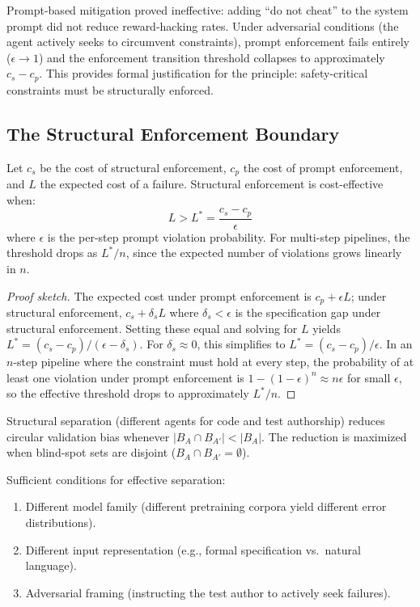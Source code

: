 Prompt-based mitigation proved ineffective: adding ``do not cheat'' to the system prompt did not reduce reward-hacking rates. Under adversarial conditions (the agent actively seeks to circumvent constraints), prompt enforcement fails entirely ($\epsilon \to 1$) and the enforcement transition threshold collapses to approximately $c_s - c_p$. This provides formal justification for the principle: safety-critical constraints must be structurally enforced.

\subsection{The Structural Enforcement Boundary}

\begin{theorem}
\label{thm:structural-boundary}
Let $c_s$ be the cost of structural enforcement, $c_p$ the cost of prompt enforcement, and $L$ the expected cost of a failure. Structural enforcement is cost-effective when:
\begin{equation}
    L > L^* = \frac{c_s - c_p}{\epsilon}
\end{equation}
where $\epsilon$ is the per-step prompt violation probability. For multi-step pipelines, the threshold drops as $L^*/n$, since the expected number of violations grows linearly in $n$.
\end{theorem}

\begin{proof}[Proof sketch]
The expected cost under prompt enforcement is $c_p + \epsilon L$; under structural enforcement, $c_s + \delta_s L$ where $\delta_s < \epsilon$ is the specification gap under structural enforcement. Setting these equal and solving for $L$ yields $L^* = (c_s - c_p)/(\epsilon - \delta_s)$. For $\delta_s \approx 0$, this simplifies to $L^* = (c_s - c_p)/\epsilon$. In an $n$-step pipeline where the constraint must hold at every step, the probability of at least one violation under prompt enforcement is $1 - (1-\epsilon)^n \approx n\epsilon$ for small $\epsilon$, so the effective threshold drops to approximately $L^*/n$.
\end{proof}

\begin{theorem}
\label{thm:structural-separation}
Structural separation (different agents for code and test authorship) reduces circular validation bias whenever $|B_A \cap B_{A'}| < |B_A|$. The reduction is maximized when blind-spot sets are disjoint ($B_A \cap B_{A'} = \emptyset$).

Sufficient conditions for effective separation:
\begin{enumerate}[nosep]
    \item Different model family (different pretraining corpora yield different error distributions).
    \item Different input representation (e.g., formal specification vs.\ natural language).
    \item Adversarial framing (instructing the test author to actively seek failures).
\end{enumerate}
\end{theorem}

